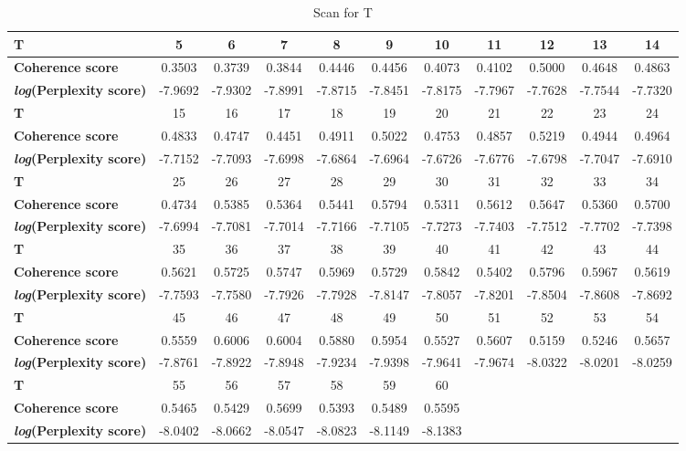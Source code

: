 \documentclass[12pt,journal,letterpaper,oneside,onecolumn]{IEEEtran}
\begin{document}
\begin{table}[h!]
\centering
    \caption{Scan for T}\label{tabl_scan_for_t}
    \begin{tabular}{l|c|c|c|c|c|c|c|c|c|c}
    \hline
    \textbf{T} & 5 & 6 & 7 & 8 & 9 & 10 & 11 & 12 & 13 & 14 \\ 
    \hline
    \textbf{Coherence score}  & 0.3503 & 0.3739 & 0.3844 & 0.4446 & 0.4456 & 0.4073 & 0.4102 & 0.5000 & 0.4648 & 0.4863 \\ 
    \textbf{\textit{log}(Perplexity score)} & -7.9692 & -7.9302 & -7.8991 & -7.8715 & -7.8451 & -7.8175 & -7.7967 & -7.7628 & -7.7544 & -7.7320 \\ 
    \hline
    \textbf{T} & 15 & 16 & 17 & 18 & 19 & 20 & 21 & 22 & 23 & 24 \\ 
    \hline
    \textbf{Coherence score}  & 0.4833 & 0.4747 & 0.4451 & 0.4911 & 0.5022 & 0.4753 & 0.4857 & 0.5219 & 0.4944 & 0.4964 \\ 
    \textbf{\textit{log}(Perplexity score)} & -7.7152 & -7.7093 & -7.6998 & -7.6864 & -7.6964 & -7.6726 & -7.6776 & -7.6798 & -7.7047 & -7.6910 \\ 
    \hline
    \textbf{T} & 25 & 26 & 27 & 28 & 29 & 30 & 31 & 32 & 33 & 34 \\ 
    \hline
    \textbf{Coherence score}  & 0.4734 & 0.5385 & 0.5364 & 0.5441 & 0.5794 & 0.5311 & 0.5612 & 0.5647 & 0.5360 & 0.5700 \\ 
    \textbf{\textit{log}(Perplexity score)} & -7.6994 & -7.7081 & -7.7014 & -7.7166 & -7.7105 & -7.7273 & -7.7403 & -7.7512 & -7.7702 & -7.7398 \\ 
    \hline
    \textbf{T} & 35 & 36 & 37 & 38 & 39 & 40 & 41 & 42 & 43 & 44 \\ 
    \hline
    \textbf{Coherence score}  & 0.5621 & 0.5725 & 0.5747 & 0.5969 & 0.5729 & 0.5842 & 0.5402 & 0.5796 & 0.5967 & 0.5619 \\ 
    \textbf{\textit{log}(Perplexity score)} & -7.7593 & -7.7580 & -7.7926 & -7.7928 & -7.8147 & -7.8057 & -7.8201 & -7.8504 & -7.8608 & -7.8692 \\ 
    \hline
    \textbf{T} & 45 & 46 & 47 & 48 & 49 & 50 & 51 & 52 & 53 & 54 \\ 
    \hline
    \textbf{Coherence score}  & 0.5559 & 0.6006 & 0.6004 & 0.5880 & 0.5954 & 0.5527 & 0.5607 & 0.5159 & 0.5246 & 0.5657 \\ 
    \textbf{\textit{log}(Perplexity score)} & -7.8761 & -7.8922 & -7.8948 & -7.9234 & -7.9398 & -7.9641 & -7.9674 & -8.0322 & -8.0201 & -8.0259 \\ 
    \hline
    \textbf{T} & 55 & 56 & 57 & 58 & 59 & 60 \\ 
    \hline
    \textbf{Coherence score}  & 0.5465 & 0.5429 & 0.5699 & 0.5393 & 0.5489 & 0.5595 \\ 
    \textbf{\textit{log}(Perplexity score)} & -8.0402 & -8.0662 & -8.0547 & -8.0823 & -8.1149 & -8.1383 \\ 
    \end{tabular}
\end{table}
\end{document}
